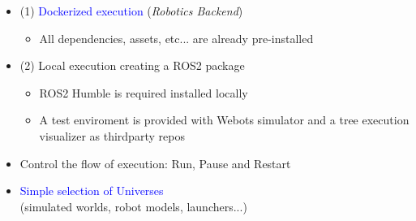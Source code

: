 \documentclass[notes,slidesec,a4]{seminar}
\begin{document}
\begin{hslide}
\newpage
 \begin{itemize}
 \item (1) \textcolor{blue}{Dockerized execution} (\textit{Robotics Backend})
 \small
   \begin{itemize}
   \item All dependencies, assets, etc... are already pre-installed     
   \end{itemize}
   \normalsize
 \item (2) Local execution creating a ROS2 package
   \small
   \begin{itemize}
   \item ROS2 Humble is required installed locally
   \item A test enviroment is provided with Webots simulator and a tree execution visualizer as thirdparty repos
   \end{itemize}
   \normalsize
 \vspace{1cm}
 \item Control the flow of execution: Run, Pause and Restart
 \item \textcolor{blue}{Simple selection of Universes}\\ (simulated worlds, robot models, launchers...)
 \end{itemize}
 

\end{hslide}
\end{document}
